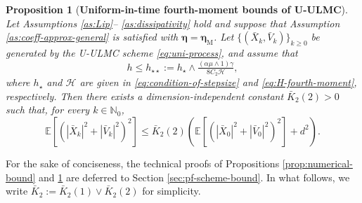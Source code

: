 \documentclass[12pt]{article}
\newenvironment{redtext}
  {\color{black}\ignorespaces}
  {\ignorespacesafterend}
\numberwithin{equation}{section}
\newtheorem{prop}{Proposition}[section]
\begin{document}
\begin{redtext}

\begin{prop}[\textbf{Uniform-in-time fourth-moment bounds of U-ULMC}]
\label{prop:uniform-fourth-moment-u-ulmc}
Let Assumptions \ref{as:Lip}--
\ref{as:dissipativity} hold and suppose that
Assumption \ref{as:coeff-approx-general} is satisfied with
$\boldsymbol{\eta}=\boldsymbol{\eta}_{\mathrm M}$.
Let
\(
\{(\bar X_k,\bar V_k)\}_{k\geq0}
\)
be generated by the U-ULMC scheme \eqref{eq:uni-process}, and assume that
\begin{equation}\label{eq:h-4-define}
h\leq h_{\star\star}:=h_\star
\wedge
\tfrac{(\alpha\mu\wedge1)\gamma}
{8C_2\mathcal H},
\end{equation}
where $h_\star$ and $\mathcal H$ are given in \eqref{eq:condition-of-stepsize} and \eqref{eq:H-fourth-moment}, respectively. Then there exists a dimension-independent constant
\(\bar K_2(2)>0\) such that, for every
\(k\in\mathbb N_0\),
\begin{equation}
\label{eq:uniform-fourth-moment-compact}
\mathbb E
\left[
\left(
|\bar X_k|^2+|\bar V_k|^2
\right)^2
\right]
\leq
\bar K_2(2)
\left(
\mathbb E
\left[
\left(
|\bar X_0|^2+|\bar V_0|^2
\right)^2
\right]
+d^2
\right).
\end{equation}
\end{prop}
    
\end{redtext}

For the sake of conciseness, the technical proofs of Propositions \ref{prop:numerical-bound} and \ref{prop:uniform-fourth-moment-u-ulmc}
are deferred to Section \ref{sec:pf-scheme-bound}. 
\begin{redtext}
In what follows, we write
$\bar K_2:=\bar K_2(1) \vee \bar K_2(2)$ for simplicity.   
\end{redtext}
\end{document}
